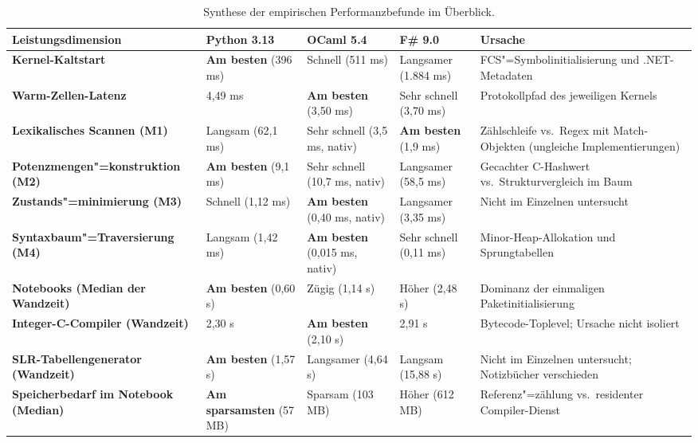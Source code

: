 \begin{table}[htbp]
  \centering
  \scriptsize
  \caption{Synthese der empirischen Performanzbefunde im Überblick.}
  \label{tab:performance_synthesis}
  \begin{tabularx}{\textwidth}{>{\raggedright\arraybackslash}p{2.6cm}p{1.9cm}p{1.9cm}p{1.9cm}>{\raggedright\arraybackslash}X}
    \toprule
    \textbf{Leistungsdimension} & \textbf{Python 3.13} & \textbf{OCaml 5.4} & \textbf{F\# 9.0} & \textbf{Ursache} \\
    \midrule
    \textbf{Kernel-Kaltstart} &
      \textbf{Am besten} (396 ms) &
      Schnell (511 ms) &
      Langsamer (1.884 ms) &
      FCS"=Symbolinitialisierung und .NET-Metadaten \\
    \addlinespace[3pt]
    \textbf{Warm-Zellen-Latenz} &
      4,49 ms &
      \textbf{Am besten} (3,50 ms) &
      Sehr schnell (3,70 ms) &
      Protokollpfad des jeweiligen Kernels \\
    \addlinespace[3pt]
    \textbf{Lexikalisches Scannen (M1)} &
      Langsam (62,1 ms) &
      Sehr schnell (3,5 ms, nativ) &
      \textbf{Am besten} (1,9 ms) &
      Zählschleife vs.\ Regex mit Match-Objekten (ungleiche Implementierungen) \\
    \addlinespace[3pt]
    \textbf{Potenzmengen"=konstruktion (M2)} &
      \textbf{Am besten} (9,1 ms) &
      Sehr schnell (10,7 ms, nativ) &
      Langsamer (58,5 ms) &
      Gecachter C-Hashwert vs.\ Strukturvergleich im Baum \\
    \addlinespace[3pt]
    \textbf{Zustands"=minimierung (M3)} &
      Schnell (1,12 ms) &
      \textbf{Am besten} (0,40 ms, nativ) &
      Langsamer (3,35 ms) &
      Nicht im Einzelnen untersucht \\
    \addlinespace[3pt]
    \textbf{Syntaxbaum"=Traversierung (M4)} &
      Langsam (1,42 ms) &
      \textbf{Am besten} (0,015 ms, nativ) &
      Sehr schnell (0,11 ms) &
      Minor-Heap-Allokation und Sprungtabellen \\
    \addlinespace[3pt]
    \textbf{Notebooks (Median der Wandzeit)} &
      \textbf{Am besten} (0,60 s) &
      Zügig (1,14 s) &
      Höher (2,48 s) &
      Dominanz der einmaligen Paketinitialisierung \\
    \addlinespace[3pt]
    \textbf{Integer-C-Compiler (Wandzeit)} &
      2,30 s &
      \textbf{Am besten} (2,10 s) &
      2,91 s &
      Bytecode-Toplevel; Ursache nicht isoliert \\
    \addlinespace[3pt]
    \textbf{SLR-Tabellengenerator (Wandzeit)} &
      \textbf{Am besten} (1,57 s) &
      Langsamer (4,64 s) &
      Langsam (15,88 s) &
      Nicht im Einzelnen untersucht; Notizbücher verschieden \\
    \addlinespace[3pt]
    \textbf{Speicherbedarf im Notebook (Median)} &
      \textbf{Am sparsamsten} (57 MB) &
      Sparsam (103 MB) &
      Höher (612 MB) &
      Referenz"=zählung vs.\ residenter Compiler-Dienst \\
    \bottomrule
  \end{tabularx}
\end{table}

